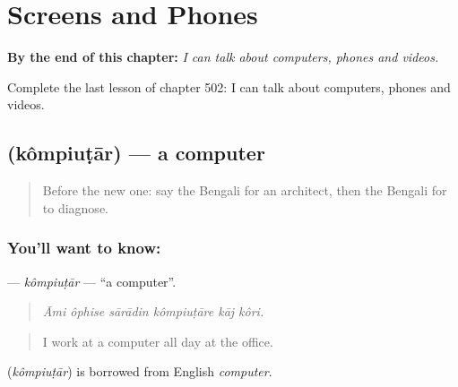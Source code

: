 
\chapter{Screens and Phones}
\label{ch:bn-screens-and-phones}

\begin{chapteropening}
\textbf{By the end of this chapter:} \emph{I can talk about computers, phones and videos.}

Complete the last lesson of chapter 502: I can talk about computers, phones and videos.
\end{chapteropening}

\section[\texorpdfstring{\bn{কম্পিউটার} (kômpiuṭār)}{কম্পিউটার (kômpiuṭār)}]{ (kômpiuṭār) — a computer}

\label{lesson:BN-C502-kompiutar}



\begin{quote}
Before the new one: say the Bengali for an architect, then the Bengali for to diagnose.
\end{quote}

\subsection*{You'll want to know: }
\textbf{} — \emph{kômpiuṭār} — \textquotedblleft{}a computer\textquotedblright{}.

\begin{quote}
     
\end{quote}

\begin{quote}
\emph{Āmi ôphise sārādin kômpiuṭāre kāj kôri.}
\end{quote}

\begin{quote}
I work at a computer all day at the office.
\end{quote}

\begin{cousinweb}
\textbf{} (\emph{kômpiuṭār}) is borrowed from English \emph{computer}.
\end{cousinweb}

